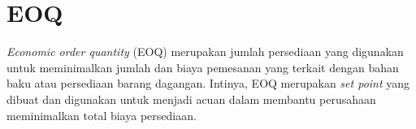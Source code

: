 		




		



		



		
		
		


\section{EOQ}

\textit{Economic order quantity} (EOQ) merupakan jumlah persediaan yang digunakan untuk meminimalkan jumlah dan biaya pemesanan yang terkait dengan bahan baku atau persediaan barang dagangan. Intinya, EOQ merupakan \textit{set point} yang dibuat dan digunakan untuk menjadi acuan dalam membantu perusahaan meminimalkan total biaya persediaan.

